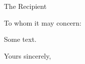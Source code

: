 \documentclass[
  11pt,a4,backaddress=off,english,fromphone, fromemail,
fromalign=right, fromplace,
version=last
]{scrlttr2}
\begin{document}
\begin{letter}{The Recipient}

\opening{To whom it may concern:}
Some text.
\closing{Yours sincerely,}

\end{letter}
\end{document}
